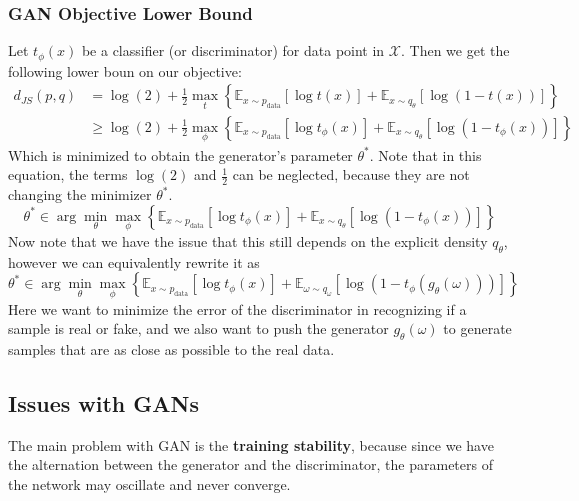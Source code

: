 \subsubsection{GAN Objective Lower Bound}
Let \(t_\phi(x)\) be a classifier (or discriminator) for data point in \(\mathcal{X}\). Then we get the following lower boun on our objective:
\begin{align}
    d_{JS} (p,q) &= \log (2) + \frac 1 2 \max_t \left\{
        \mathbb{E}_{x \sim p_\text{data}} \left[ \log t(x) \right] + \mathbb{E}_{x \sim q_\theta} \left[ \log (1 - t(x)) \right]
    \right\}\\
    &\geq \log (2) + \frac 1 2 \max_\phi \left\{
        \mathbb{E}_{x \sim p_\text{data}} \left[ \log t_\phi(x) \right] + \mathbb{E}_{x \sim q_\theta} \left[ \log (1 - t_\phi(x)) \right]
    \right\}
\end{align}
Which is minimized to obtain the generator's parameter \(\theta^*\). Note that in this equation, the terms \(\log (2)\) and \(\frac 1 2\) can be neglected, because they are not changing the minimizer \(\theta^*\).
\begin{equation}
    \theta^* \in \arg \min_\theta \max_\phi \left\{
        \mathbb{E}_{x \sim p_\text{data}} \left[ \log t_\phi(x) \right] + \mathbb{E}_{x \sim q_\theta} \left[ \log (1 - t_\phi(x)) \right]
    \right\}
\end{equation}
Now note that we have the issue that this still depends on the explicit density \(q_\theta\), however we can equivalently rewrite it as
\begin{equation}
    \theta^* \in \arg \min_\theta \max_\phi \left\{
        \mathbb{E}_{x \sim p_\text{data}} \left[ \log t_\phi(x) \right] + \mathbb{E}_{\omega \sim q_\omega} \left[ \log (1 - t_\phi(g_\theta(\omega))) \right]
    \right\}
\end{equation}
Here we want to minimize the error of the discriminator in recognizing if a sample is real or fake, and we also want to push the generator \(g_\theta(\omega)\) to generate samples that are as close as possible to the real data.

\subsection{Issues with GANs}
The main problem with GAN is the \textbf{training stability}, because since we have the alternation between the generator and the discriminator, the parameters of the network may oscillate and never converge. 

